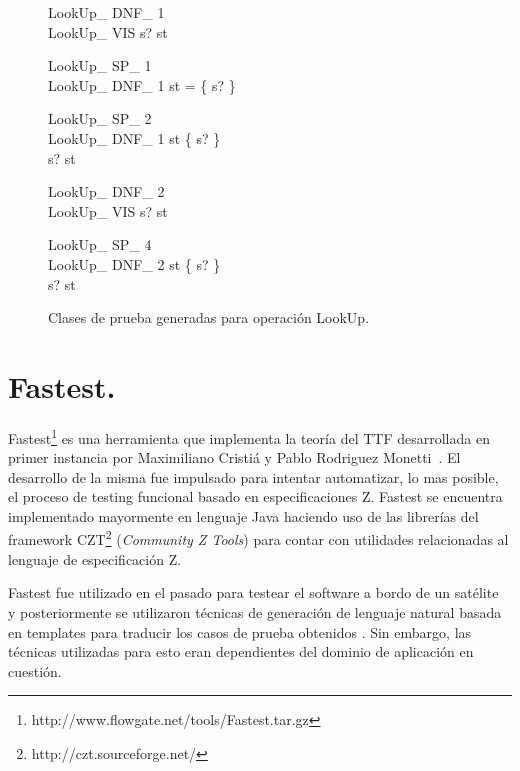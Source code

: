 \begin{figure}[H]
  \centering
  \begin{schema}{LookUp\_ DNF\_ 1}\\
  LookUp\_ VIS 
  \where
  s? \in \dom st
  \end{schema}


  \begin{schema}{LookUp\_ SP\_ 1}\\
  LookUp\_ DNF\_ 1 
  \where
  \dom st = \{ s? \}
  \end{schema}


  \begin{schema}{LookUp\_ SP\_ 2}\\
  LookUp\_ DNF\_ 1 
  \where
  \dom st \neq \{ s? \} \\
  s? \in \dom st
  \end{schema}


  \begin{schema}{LookUp\_ DNF\_ 2}\\
  LookUp\_ VIS 
  \where
  s? \notin \dom st
  \end{schema}


  \begin{schema}{LookUp\_ SP\_ 4}\\
  LookUp\_ DNF\_ 2 
  \where
  \dom st \neq \{ s? \} \\
  s? \in \dom st
  \end{schema}
  \label{fig:ej_tcl_lookup}
  \caption{Clases de prueba generadas para operación LookUp.}
\end{figure}

\section{Fastest.}

Fastest\footnote{http://www.flowgate.net/tools/Fastest.tar.gz} es una herramienta que implementa la teoría del TTF desarrollada en primer instancia por Maximiliano Cristiá y Pablo Rodriguez Monetti~\cite{fastest1}. El desarrollo de la misma fue impulsado para intentar automatizar, lo mas posible, el proceso de testing funcional basado en especificaciones Z. Fastest se encuentra implementado mayormente en lenguaje Java haciendo uso de las librerías del framework CZT\footnote{http://czt.sourceforge.net/} (\emph{Community Z Tools}) para contar con utilidades relacionadas al lenguaje de especificación Z. 

Fastest fue utilizado en el pasado para testear el software a bordo de un satélite~\cite{satelite} y posteriormente se utilizaron técnicas de generación de lenguaje natural basada en templates para traducir los casos de prueba obtenidos \cite{cristia_pluss}. Sin embargo, las técnicas utilizadas para esto eran dependientes del dominio de aplicación en cuestión.


